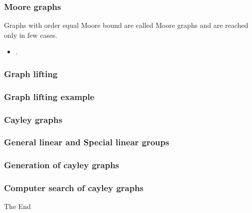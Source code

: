 \documentclass{beamer}
\begin{document}
\begin{frame}
	\frametitle{Moore graphs}
	Graphs with order equal Moore bound are called Moore graphs and are reached only in few cases.	
\begin{itemize}
    \item.
\end{itemize}
\end{frame}
\begin{frame}
	\frametitle{Graph lifting}
\end{frame}
\begin{frame}
	\frametitle{Graph lifting example}
\end{frame}
\begin{frame}
	\frametitle{Cayley graphs}
\end{frame}
\begin{frame}
	\frametitle{General linear and Special linear groups}
\end{frame}
\begin{frame}
	\frametitle{Generation of cayley graphs}
\end{frame}
\begin{frame}
	\frametitle{Computer search of cayley graphs}
\end{frame}
\begin{frame}
\Huge{\centerline{The End}}
\end{frame}

\end{document}
